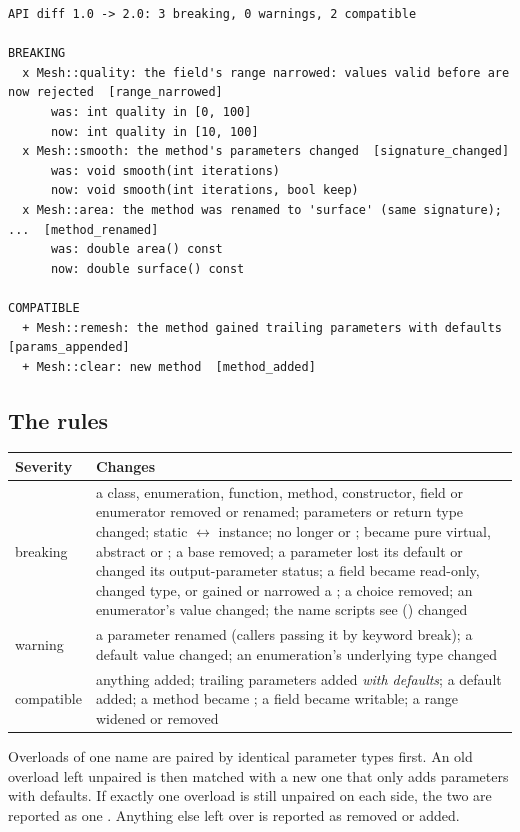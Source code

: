\begin{lstlisting}[style=plain]
API diff 1.0 -> 2.0: 3 breaking, 0 warnings, 2 compatible

BREAKING
  x Mesh::quality: the field's range narrowed: values valid before are now rejected  [range_narrowed]
      was: int quality in [0, 100]
      now: int quality in [10, 100]
  x Mesh::smooth: the method's parameters changed  [signature_changed]
      was: void smooth(int iterations)
      now: void smooth(int iterations, bool keep)
  x Mesh::area: the method was renamed to 'surface' (same signature); ...  [method_renamed]
      was: double area() const
      now: double surface() const

COMPATIBLE
  + Mesh::remesh: the method gained trailing parameters with defaults  [params_appended]
  + Mesh::clear: new method  [method_added]
\end{lstlisting}

\subsection{The rules}

\begin{center}
\small
\begin{tabular}{@{}lL{9.6cm}@{}}
\toprule
\textbf{Severity} & \textbf{Changes} \\
\midrule
breaking & a class, enumeration, function, method, constructor, field or
  enumerator removed or renamed; parameters or return type changed; static
  $\leftrightarrow$ instance; no longer  or ; became
  pure virtual, abstract or ; a base removed; a parameter lost its
  default or changed its output-parameter status; a field became read-only,
  changed type, or gained or narrowed a ; a  choice
  removed; an enumerator's value changed; the name scripts see
  () changed \\
\addlinespace
warning & a parameter renamed (callers passing it by keyword break); a default
  value changed; an enumeration's underlying type changed \\
\addlinespace
compatible & anything added; trailing parameters added \emph{with defaults};
  a default added; a method became ; a field became writable; a
  range widened or removed \\
\bottomrule
\end{tabular}
\end{center}

Overloads of one name are paired by identical parameter types first. An old
overload left unpaired is then matched with a new one that only adds
parameters with defaults. If exactly one overload is still unpaired on each
side, the two are reported as one . Anything else
left over is reported as removed or added.

